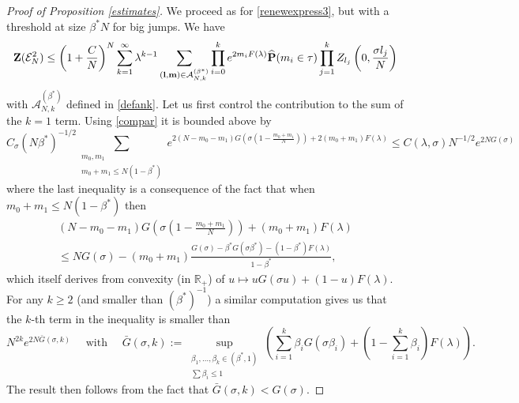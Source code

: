 \documentclass[reqno,11pt]{amsart}
\numberwithin{equation}{section}
\newcommand{\bbR}{{\ensuremath{\mathbb R}} }
\newcommand{\gb}{\beta}
\newcommand{\gl}{\lambda}
\newcommand{\gs}{\sigma}
\newcommand{\cA}{{\ensuremath{\mathcal A}} }
\newcommand{\cE}{{\ensuremath{\mathcal E}} }
\newcommand{\bP}{{\ensuremath{\mathbf P}} }
\newcommand{\bZ}{{\ensuremath{\mathbf Z}} }
\renewcommand{\hat}{\widehat}
\newcommand{\suptwo}[2]{\sup_{\substack{#1 \\ #2}}} %
\newcommand{\sumtwo}[2]{\sum_{\substack{#1 \\ #2}}} %
\begin{document}
\begin{proof}[Proof of Proposition \ref{estimates}]
\medskip

 We proceed as for \eqref{renewexpress3}, but with a threshold at size $\beta^*N$ for big jumps. We have
 \begin{equation}
 \bZ(\cE^2_N)\le  \left(1+ \frac{C}{N}\right)^N 
 \sum_{k=1}^{\infty} \gl^{k- 1} \sum_{ ({\bf l}, {\bf m})\in \cA^{(\beta^*)}_{N,k}} \prod_{i=0}^k e^{2m_i  F(\gl) } \hat \bP( m_i \in \tau)  \prod_{j=1}^k Z_{l_j}\left(0,\frac{\sigma l_j}{N}\right)
 \end{equation}
 with  $\cA^{(\beta^*)}_{N,k}$ defined in \eqref{defank}.
 Let us first control the contribution to the sum of the $k=1$ term. Using \eqref{compar} it is bounded above by  
 \begin{equation}
 C_{\sigma}  (N  \gb^*)^{-1/2} \sumtwo{m_0,m_1}{m_0+m_1\le N(1- \beta^* )} e^{2(N-m_0-m_1) G\left(\sigma \left(1-\frac{m_0  + m_1}{N}\right)\right)  +2(m_0+m_1)F(\gl) }\le  C(\gl,\gs) N^{-1/2}e^{2NG(\sigma)}
 \end{equation}
where the last inequality is a consequence of the fact that when $m_0+m_1\le N(1- \beta^* )$ then
\begin{multline}\label{convexitrick}
(N-m_0-m_1) G\left(\sigma \left(1-\frac{m_0  + m_1}{N}\right)\right)  +(m_0+m_1)F(\gl)
\\ \le N G(\sigma)-(m_0+m_1) \frac{ G(\sigma)- \beta^* G(\sigma\beta^*)-(1-\beta^*)F(\gl)}{1-\beta^*},
\end{multline}
which itself derives from convexity (in $\bbR_+$) of $u \mapsto u G(\sigma u) + (1-u)F(\gl)$. 
For any $k\ge 2$ (and smaller than $(\beta^*)^{-1}$) a similar computation gives us that the $k$-th term in the inequality is smaller than  
$$ N^{2k} e^{2N \bar G(\sigma, k)} \quad \text{ with } \quad \bar G(\sigma, k):= \suptwo{\beta_1,\dots, \beta_k \in (\beta^*,1)}{\sum \beta_i\le 1}\left( \sum_{i=1}^k \beta_i G\left(\sigma\beta_i\right)+ (1-\sum_{i=1}^k \beta_i) F(\gl)\right). $$
The result then follows from the fact that $\bar G(\sigma, k)<G(\sigma)$.

 \medskip
 


\end{proof}
\end{document}
